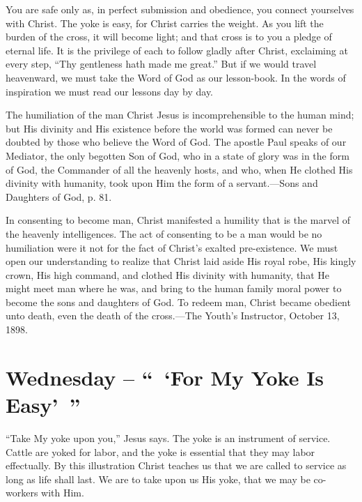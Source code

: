 \documentclass[a4paper, 10pt, twoside, headings=small]{scrartcl}
\begin{document}
\begin{multicols}{2}
You are safe only as, in perfect submission and obedience, you connect yourselves with Christ. The yoke is easy, for Christ carries the weight. As you lift the burden of the cross, it will become light; and that cross is to you a pledge of eternal life. It is the privilege of each to follow gladly after Christ, exclaiming at every step, “Thy gentleness hath made me great.” But if we would travel heavenward, we must take the Word of God as our lesson-book. In the words of inspiration we must read our lessons day by day.

The humiliation of the man Christ Jesus is incomprehensible to the human mind; but His divinity and His existence before the world was formed can never be doubted by those who believe the Word of God. The apostle Paul speaks of our Mediator, the only begotten Son of God, who in a state of glory was in the form of God, the Commander of all the heavenly hosts, and who, when He clothed His divinity with humanity, took upon Him the form of a servant.—Sons and Daughters of God, p. 81.

In consenting to become man, Christ manifested a humility that is the marvel of the heavenly intelligences. The act of consenting to be a man would be no humiliation were it not for the fact of Christ’s exalted pre-existence. We must open our understanding to realize that Christ laid aside His royal robe, His kingly crown, His high command, and clothed His divinity with humanity, that He might meet man where he was, and bring to the human family moral power to become the sons and daughters of God. To redeem man, Christ became obedient unto death, even the death of the cross.—The Youth’s Instructor, October 13, 1898.

\section*{Wednesday – “ ‘For My Yoke Is Easy’ ”}

“Take My yoke upon you,” Jesus says. The yoke is an instrument of service. Cattle are yoked for labor, and the yoke is essential that they may labor effectually. By this illustration Christ teaches us that we are called to service as long as life shall last. We are to take upon us His yoke, that we may be co-workers with Him.


\end{multicols}
\end{document}
